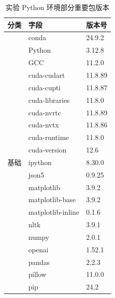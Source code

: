 \begin{table}[htbp]
\centering
\caption{实验 Python 环境部分重要包版本} \label{tab:python-env}
\begin{tabular}{cll}
\toprule
\textbf{分类}                  & \textbf{字段}       & \textbf{版本号} \\ \midrule
\multirow{28}{*}{基础}         & conda             & 24.9.2       \\
                             & Python            & 3.12.8       \\
                             & GCC               & 11.2.0       \\
                             & cuda-cudart       & 11.8.89      \\
                             & cuda-cupti        & 11.8.87      \\
                             & cuda-libraries    & 11.8.0       \\
                             & cuda-nvrtc        & 11.8.89      \\
                             & cuda-nvtx         & 11.8.86      \\
                             & cuda-runtime      & 11.8.0       \\
                             & cuda-version      & 12.6         \\
                             & ipython           & 8.30.0       \\
                             & json5             & 0.9.25       \\
                             & matplotlib        & 3.9.2        \\
                             & matplotlib-base   & 3.9.2        \\
                             & matplotlib-inline & 0.1.6        \\
                             & nltk              & 3.9.1        \\
                             & numpy             & 2.0.1        \\
                             & openai            & 1.52.1       \\
                             & pandas            & 2.2.3        \\
                             & pillow            & 11.0.0       \\
                             & pip               & 24.2         \\

\end{tabular}
\end{table}
